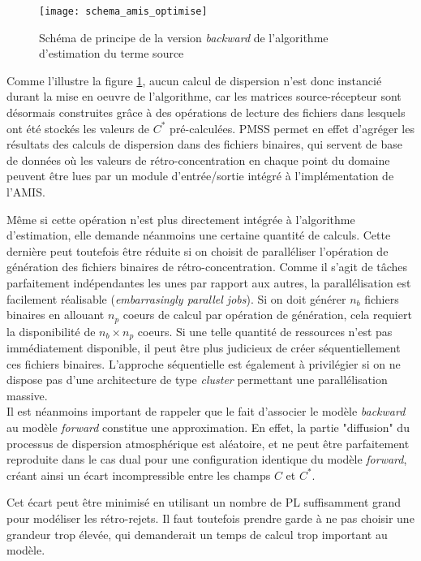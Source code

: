 \begin{figure}[h!]
	\centering
	\texttt{[image: schema\_amis\_optimise]}
	\caption{Schéma de principe de la version \textit{backward} de l'algorithme d'estimation du terme source}
	\label{fig_schema_amis_optimise}
\end{figure}

Comme l'illustre la figure \ref{fig_schema_amis_optimise}, aucun calcul de dispersion n'est donc instancié durant la mise en oeuvre de l'algorithme, car les matrices source-récepteur sont désormais construites grâce à des opérations de lecture des fichiers dans lesquels ont été stockés les valeurs de $C^*$ pré-calculées. PMSS permet en effet d'agréger les résultats des calculs de dispersion dans des fichiers binaires, qui servent de base de données où les valeurs de rétro-concentration en chaque point du domaine peuvent être lues par un module d'entrée/sortie intégré à l'implémentation de l'AMIS.

Même si cette opération n'est plus directement intégrée à l'algorithme d'estimation, elle demande néanmoins une certaine quantité de calculs. Cette dernière peut toutefois être réduite si on choisit de paralléliser l'opération de génération des fichiers binaires de rétro-concentration. Comme il s'agit de tâches parfaitement indépendantes les unes par rapport aux autres, la parallélisation est facilement réalisable (\textit{embarrasingly parallel jobs}). Si on doit générer $n_b$ fichiers binaires en allouant $n_p$ coeurs de calcul par opération de génération, cela requiert la disponibilité de $n_b \times n_p$ coeurs. Si une telle quantité de ressources n'est pas immédiatement disponible, il peut être plus judicieux de créer séquentiellement ces fichiers binaires. L'approche séquentielle est également à privilégier si on ne dispose pas d'une architecture de type \textit{cluster} permettant une parallélisation massive. \\


Il est néanmoins important de rappeler que le fait d'associer le modèle \textit{backward} au modèle \textit{forward} constitue une approximation. En effet, la partie "diffusion" du processus de dispersion atmosphérique est aléatoire, et ne peut être parfaitement reproduite dans le cas dual pour une configuration identique du modèle \textit{forward}, créant ainsi un écart incompressible entre les champs $C$ et $C^*$. 

Cet écart peut être minimisé en utilisant un nombre de PL suffisamment grand pour modéliser les rétro-rejets. Il faut toutefois prendre garde à ne pas choisir une grandeur trop élevée, qui demanderait un temps de calcul trop important au modèle. 


